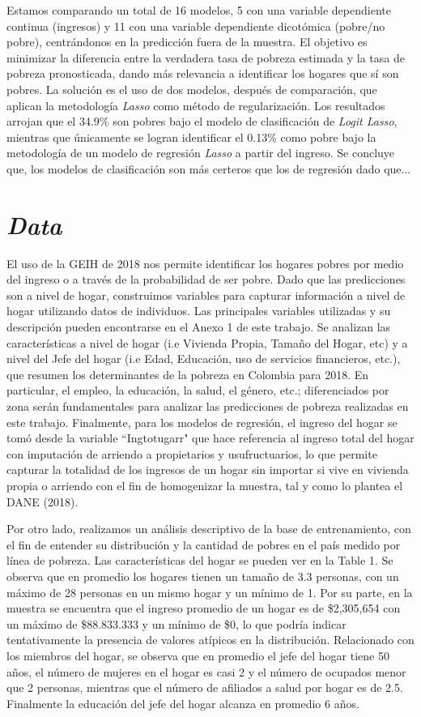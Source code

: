 \documentclass[11pt]{article}
\begin{document}
\justify
Estamos comparando un total de 16 modelos, 5 con una variable dependiente continua (ingresos) y 11 con una variable dependiente dicotómica (pobre/no pobre), centrándonos en la predicción fuera de la muestra. El objetivo es minimizar la diferencia entre la verdadera tasa de pobreza estimada y la tasa de pobreza pronosticada, dando más relevancia a identificar los hogares que sí son pobres. La solución es el uso de dos modelos, después de comparación, que aplican la metodología \emph{Lasso} como método de regularización. Los resultados arrojan que el 34.9\% son pobres bajo el modelo de clasificación de \emph {Logit Lasso}, mientras que únicamente se logran identificar el 0.13\%  como pobre bajo la metodología de un modelo de regresión \emph{Lasso} a partir del ingreso. Se concluye que, los modelos de clasificación son más certeros que los de regresión dado que...

\section{\bf\emph {Data}} \label{sec:data}
\justify 
El uso de la GEIH de 2018 nos permite identificar los hogares pobres por medio del ingreso o a través de la probabilidad de ser pobre. Dado que las predicciones son a nivel de hogar, construimos variables para capturar información a nivel de hogar utilizando datos de individuos. Las principales variables utilizadas y su descripción pueden encontrarse en el Anexo 1 de este trabajo. Se analizan las características a nivel de hogar (i.e Vivienda Propia, Tamaño del Hogar, etc) y a nivel del Jefe del hogar (i.e Edad, Educación, uso de servicios financieros, etc.), que resumen los determinantes de la pobreza en Colombia para 2018. 
\justify
En particular, el empleo, la educación, la salud, el género, etc.; diferenciados por zona serán fundamentales para analizar las predicciones de pobreza realizadas en este trabajo. Finalmente, para los modelos de regresión, el ingreso del hogar se tomó desde la variable ``Ingtotugarr" que hace referencia al ingreso total del hogar con imputación de arriendo a
propietarios y usufructuarios, lo que permite capturar la totalidad de los ingresos de un hogar sin importar si vive en vivienda propia o arriendo con el fin de homogenizar la muestra, tal y como lo plantea el DANE (2018).

\justify 
Por otro lado, realizamos un análisis descriptivo de la base de entrenamiento, con el fin de entender su distribución y la cantidad de pobres en el país medido por línea de pobreza. Las características del hogar se pueden ver en la Table 1. Se observa que en promedio los hogares tienen un tamaño de 3.3 personas, con un máximo de 28 personas en un mismo hogar y un mínimo de 1. Por su parte, en la muestra se encuentra que el ingreso promedio de un hogar es de \$2,305,654 con un máximo de \$88.833.333 y un mínimo de \$0, lo que podría indicar tentativamente la presencia de valores atípicos en la distribución. Relacionado con los miembros del hogar, se observa que en promedio el jefe del hogar tiene 50 años, el número de mujeres en el hogar es casi 2 y el número de ocupados menor que 2 personas, mientras que el número de afiliados a salud por hogar es de 2.5. Finalmente la educación del jefe del hogar alcanza en promedio 6 años. 
\end{document}
